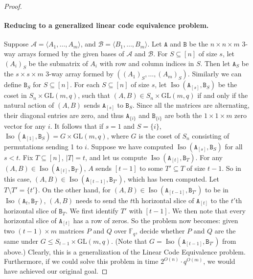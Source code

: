 \documentclass[10pt,a4paper]{article}
\begin{document}
\begin{proof}
\paragraph{Reducing to a generalized linear code equivalence problem.} Suppose $\mathcal A=\langle A_1,\ldots,A_m\rangle$, and $\mathcal B=\langle B_1,\ldots,B_m\rangle$. Let $\mathtt A$ and $\mathtt B$ be the $n\times n\times m$ 3-way arrays formed by the given bases of $\mathcal A$ and $\mathcal B$. For $S\subseteq[n]$ of size $s$, let $(A_i)_S$ be the submatrix of $A_i$ with row and column indices in $S$. Then let $\mathtt A_S$ be the $s\times s\times m$ 3-way array formed by $((A_1)_S,\ldots,(A_m)_S)$. Similarly we can define $\mathtt B_S$ for $S\subseteq[n]$.
For each $S\subseteq[n]$ of size $s$, let $\operatorname{Iso}(\mathtt A_{[s]},\mathtt B_S)$ be the coset in $S_n\times\mathrm{GL}(m,q)$, such that $(A,B)\in S_n\times\mathrm{GL}(m,q)$ if and only if the natural action of $(A,B)$ sends $\mathtt A_{[s]}$ to $\mathtt B_S$. Since all the matrices are alternating, their diagonal entries are zero, and thus $\mathtt A_{\{i\}}$ and $\mathtt B_{\{i\}}$ are both the $1\times1\times m$ zero vector for any $i$. It follows that if $s=1$ and $S=\{i\}$, $\operatorname{Iso}(\mathtt A_{[1]},\mathtt B_S)=G\times\mathrm{GL}(m,q)$, where $G$ is the coset of $S_n$ consisting of permutations sending 1 to $i$.
Suppose we have computed $\operatorname{Iso}(\mathtt A_{[s]},\mathtt B_S)$ for all $s<t$. Fix $T\subseteq[n]$, $|T|=t$, and let us compute $\operatorname{Iso}(\mathtt A_{[t]},\mathtt B_T)$. For any $(A,B)\in\operatorname{Iso}(\mathtt A_{[t]},\mathtt B_T)$, $A$ sends $[t-1]$ to some $T'\subseteq T$ of size $t-1$. So in this case, $(A,B)\in\operatorname{Iso}(\mathtt A_{[t-1]},\mathtt B_{T'})$, which has been computed. Let $T\setminus T'=\{t'\}$. On the other hand, for $(A,B)\in\operatorname{Iso}(\mathtt A_{[t-1]},\mathtt B_{T'})$ to be in $\operatorname{Iso}(\mathtt A_t,\mathtt B_T)$, $(A,B)$ needs to send the $t$th horizontal slice of $\mathtt A_{[t]}$ to the $t'$th horizontal slice of $\mathtt B_T$.
We first identify $T'$ with $[t-1]$. We then note that every horizontal slice of $\mathtt A_{[t]}$ has a row of zeros. So the problem now becomes: given two $(t-1)\times m$ matrices $P$ and $Q$ over $\mathbb F_q$, decide whether $P$ and $Q$ are the same under $G\le S_{t-1}\times\mathrm{GL}(m,q)$. (Note that $G=\operatorname{Iso}(\mathtt A_{[t-1]},\mathtt B_{T'})$ from above.) Clearly, this is a generalization of the Linear Code Equivalence problem. Furthermore, if we could solve this problem in time $2^{O(n)}\cdot q^{O(m)}$, we would have achieved our original goal.

\end{proof}
\end{document}
